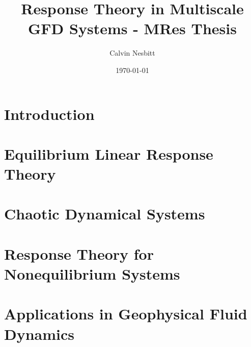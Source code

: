 \documentclass[11pt,letterpaper,twoside,openright]{book}
\title{Response Theory in Multiscale GFD Systems - MRes Thesis}
\date{\today}
\author{Calvin Nesbitt}
\begin{document}
\maketitle

\tableofcontents 

\cleardoublepage

\chapter{Introduction}

\chapter{Equilibrium Linear Response Theory}





\chapter{Chaotic Dynamical Systems}


\chapter{Response Theory for Nonequilibrium Systems}

%

\chapter{Applications in Geophysical Fluid Dynamics}



\clearpage 

\end{document}
